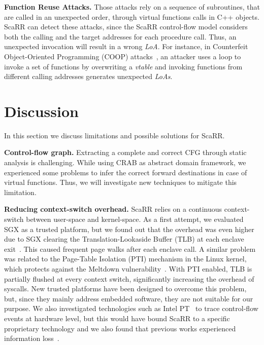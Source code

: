 \textbf{Function Reuse Attacks.}
Those attacks rely on a sequence of subroutines, that are called in an 
unexpected order, \eg through virtual functions calls in C++ objects. ScaRR can 
detect these attacks, since the ScaRR control-flow model considers both the 
calling and the target addresses for each procedure call. Thus, an unexpected 
invocation will result in a wrong \emph{LoA}.
For instance, in Counterfeit Object-Oriented Programming (COOP) 
attacks~\citep{schuster2015counterfeit}, an attacker uses a loop to invoke a 
set of functions by overwriting a \emph{vtable} and invoking functions from 
different calling addresses generates unexpected \emph{LoAs}.

\section{Discussion}
\label{sec:discussion_scarr}
In this section we discuss limitations and possible solutions for ScaRR.

\textbf{Control-flow graph.}
Extracting a complete and correct CFG through static analysis is challenging.
While using CRAB as abstract domain framework, we experienced some problems
to infer the correct forward destinations in case of virtual functions. Thus, 
we will investigate new techniques to mitigate this limitation.

\textbf{Reducing context-switch overhead.}
ScaRR relies on a continuous context-switch between user-space and kernel-space.
As a first attempt, we evaluated SGX as a trusted platform, but we found out 
that the overhead was even higher due to SGX clearing the Translation-Lookaside 
Buffer (TLB) at each enclave exit~\citep{stravers2013translation}.
This caused frequent page walks after each enclave call.
A similar problem was related to the Page-Table Isolation 
(PTI) mechanism in the Linux kernel, which protects against the Meltdown 
vulnerability~\citep{watson2018capability}.
With PTI enabled, TLB is partially flushed at every context switch, 
significantly increasing the overhead of syscalls.
New trusted platforms have been designed to overcome this problem, but, since 
they mainly address embedded software, they are not suitable for our purpose.
We also investigated technologies such as Intel 
PT~\citep{Ge:2017:GGC:3037697.3037716} to trace 
control-flow events at hardware level, but this would have bound ScaRR to a 
specific proprietary technology and we also found that previous 
works experienced information 
loss~\citep{Ge:2017:GGC:3037697.3037716,hu2018enforcing}.

